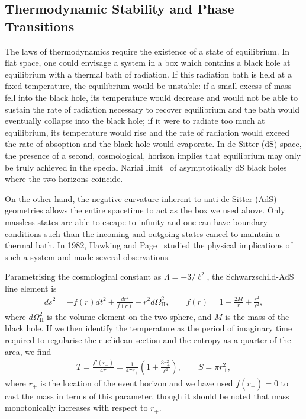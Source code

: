 \documentclass[
twoside,
openright,
frontopenright
]{dmathesis}
\begin{document}
\subsection{Thermodynamic Stability and Phase Transitions}
\label{sec:hawkingpage}

The laws of thermodynamics require the existence of a state of equilibrium. In
flat space, one could envisage a system in a box which contains a black hole at
equilibrium with a thermal bath of radiation. If this radiation bath is held at
a fixed temperature, the equilibrium would be unstable: if a small excess of
mass fell into the black hole, its temperature would decrease and would not be
able to sustain the rate of radiation necessary to recover equilibrium and the
bath would eventually collapse into the black hole; if it were to radiate too
much at equilibrium, its temperature would rise and the rate of radiation would
exceed the rate of absoption and the black hole would evaporate. In de Sitter
(dS) space, the presence of a second, cosmological, horizon implies that
equilibrium may only be truly achieved in the special Nariai
limit~\cite{Nariai:1950aa,Nariai:1951aa} of asymptotically dS black holes where
the two horizons coincide.

On the other hand, the negative curvature inherent to anti-de Sitter (AdS)
geometries allows the entire spacetime to act as the box we used above. Only
massless states are able to escape to infinity and one can have boundary
conditions such than the incoming and outgoing states cancel to maintain a
thermal bath. In 1982, Hawking and Page~\cite{Hawking:1982dh} studied the
physical implications of such a system and made several observations.

Parametrising the cosmological constant as $\Lambda = -3/\ell^2$, the
Schwarzschild-AdS line element is
\begin{gather}
  ds^2 = -f(r)dt^2 + \frac{dr^2}{f(r)} + r^2 d\Omega_{\mathrm{II}}^2, \qquad
  f(r) = 1-\frac{2M}{r}+\frac{r^2}{\ell^2},
  \label{eq:schwAdS}
\end{gather}
where $d\Omega_\mathrm{II}^2$ is the volume element on the two-sphere, and $M$
is the mass of the black hole. If we then identify the temperature as the period
of imaginary time required to regularise the euclidean section and the entropy
as a quarter of the area, we find
\begin{align}
  T = \frac{f'(r_+)}{4\pi} = \frac{1}{4\pi
    r_+}\left(1+\frac{3r_+^2}{\ell^2}\right), \qquad S = \pi r_+^2,
\end{align}
where $r_+$ is the location of the event horizon and we have used $f(r_+)=0$ to
cast the mass in terms of this parameter, though it should be noted that mass
monotonically increases with respect to $r_+$.
\end{document}
